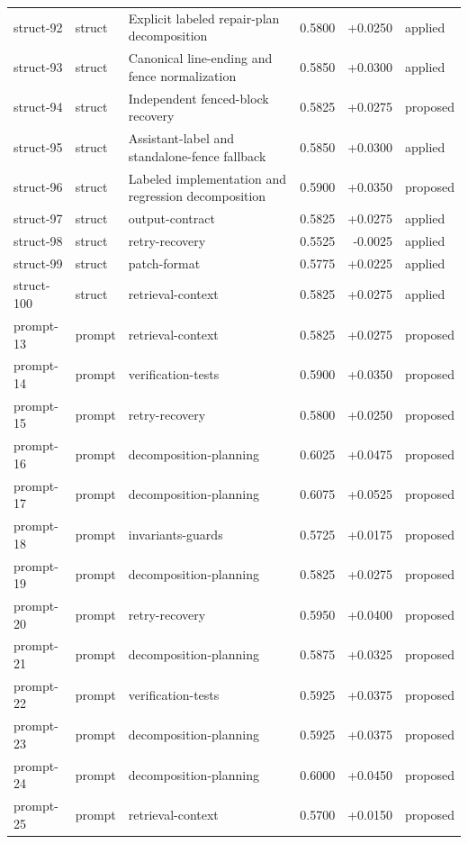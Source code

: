 \begin{center}
\begin{longtable}{llp{5.2cm}rrl}
struct-92 & struct & Explicit labeled repair-plan decomposition & 0.5800 & +0.0250 & applied \\
struct-93 & struct & Canonical line-ending and fence normalization & 0.5850 & +0.0300 & applied \\
struct-94 & struct & Independent fenced-block recovery & 0.5825 & +0.0275 & proposed \\
struct-95 & struct & Assistant-label and standalone-fence fallback & 0.5850 & +0.0300 & applied \\
struct-96 & struct & Labeled implementation and regression decomposition & 0.5900 & +0.0350 & proposed \\
struct-97 & struct & output-contract & 0.5825 & +0.0275 & applied \\
struct-98 & struct & retry-recovery & 0.5525 & -0.0025 & applied \\
struct-99 & struct & patch-format & 0.5775 & +0.0225 & applied \\
struct-100 & struct & retrieval-context & 0.5825 & +0.0275 & applied \\
prompt-13 & prompt & retrieval-context & 0.5825 & +0.0275 & proposed \\
prompt-14 & prompt & verification-tests & 0.5900 & +0.0350 & proposed \\
prompt-15 & prompt & retry-recovery & 0.5800 & +0.0250 & proposed \\
prompt-16 & prompt & decomposition-planning & 0.6025 & +0.0475 & proposed \\
prompt-17 & prompt & decomposition-planning & 0.6075 & +0.0525 & proposed \\
prompt-18 & prompt & invariants-guards & 0.5725 & +0.0175 & proposed \\
prompt-19 & prompt & decomposition-planning & 0.5825 & +0.0275 & proposed \\
prompt-20 & prompt & retry-recovery & 0.5950 & +0.0400 & proposed \\
prompt-21 & prompt & decomposition-planning & 0.5875 & +0.0325 & proposed \\
prompt-22 & prompt & verification-tests & 0.5925 & +0.0375 & proposed \\
prompt-23 & prompt & decomposition-planning & 0.5925 & +0.0375 & proposed \\
prompt-24 & prompt & decomposition-planning & 0.6000 & +0.0450 & proposed \\
prompt-25 & prompt & retrieval-context & 0.5700 & +0.0150 & proposed \\

\end{longtable}
\end{center}
